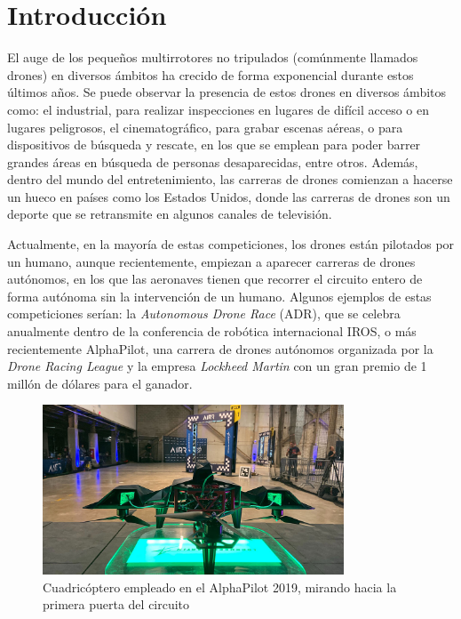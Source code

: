 \chapter{Introducción}


El auge de los pequeños multirrotores no tripulados (comúnmente llamados drones) en diversos ámbitos ha crecido de forma exponencial durante estos últimos años. Se puede observar la presencia de estos drones en diversos ámbitos como: el industrial, para realizar inspecciones en lugares de difícil acceso o en lugares peligrosos, el cinematográfico, para grabar escenas aéreas, o para dispositivos de búsqueda y rescate, en los que se emplean para poder barrer grandes áreas en búsqueda de personas desaparecidas, entre otros. Además, dentro del mundo del entretenimiento, las carreras de drones comienzan a hacerse un hueco en países como los Estados Unidos, donde las carreras de drones son un deporte que se retransmite en algunos canales de televisión. 

Actualmente, en la mayoría de estas competiciones, los drones están pilotados por un humano, aunque recientemente, empiezan a aparecer carreras de drones autónomos, en los que las aeronaves tienen que recorrer el circuito entero de forma autónoma sin la intervención de un humano. Algunos ejemplos de estas competiciones serían: la \textit{Autonomous Drone Race} (ADR), que se celebra anualmente dentro de la conferencia de robótica internacional  IROS, o más recientemente AlphaPilot, una carrera de drones autónomos organizada por la \textit{Drone Racing League} y la empresa \textit{Lockheed Martin} con un gran premio de 1 millón de dólares para el ganador.

\begin{figure}[htb!]
	\centering
	\includegraphics[width=0.80\textwidth]{imagenes/foehnAlphaPilot}
	\caption{Cuadricóptero empleado en el AlphaPilot 2019, mirando hacia la primera puerta del circuito \cite{foehn2020alphapilot}}
	\label{}
\end{figure}


